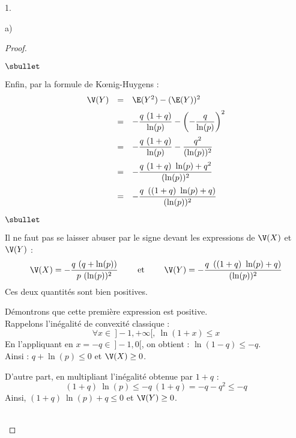 \begin{noliste}{1.}
\begin{noliste}{a)}
\begin{proof}
\begin{noliste}{$\sbullet$}
      \item Enfin, par la formule de K\oe{}nig-Huygens :
        \[
        \begin{array}{rcl}
          \V(Y) & = & \E(Y^2) - (\E(Y))^2 
          \\[.2cm]
          & = & - \dfrac{q \ (1+q)}{\ln(p)} - \left( -
            \dfrac{q}{\ln(p)} \right)^2
          \\[.4cm]
          & = & - \dfrac{q \ (1+q)}{\ln(p)} - \dfrac{q^2}{(\ln(p))^2}
          \\[.4cm]
          & = & - \dfrac{q \ (1+q) \ \ln(p) + q^2}{(\ln(p))^2}
          \\[.4cm]
          & = & - \dfrac{q \ \left( (1+q) \ \ln(p) + q \right)}{(\ln(p))^2}
        \end{array}
        \]
      \end{noliste}
      \begin{remark}%
        \begin{noliste}{$\sbullet$}
        \item Il ne faut pas se laisser abuser par le signe devant les
          expressions de $\V(X)$ et $\V(Y)$ :
          \[
          \V(X) = - \dfrac{q \ (q + \ln(p))}{p \ (\ln(p))^2} \qquad
          \text{ et } \qquad \V(Y) = - \dfrac{q \ \left( (1+q) \
              \ln(p) + q \right)}{(\ln(p))^2}
          \]
          Ces deux quantités sont bien positives.
        \item Démontrons que cette première expression est positive.\\
          Rappelons l'inégalité de convexité classique :
          \[
          \forall x \in \ ]-1, +\infty[, \ \ln(1+x) \leq x
          \]
          En l'appliquant en $x = -q \in \ ]-1, 0[$, on obtient :
          $\ln(1-q) \leq -q$.\\
          Ainsi : $q + \ln(p) \leq 0$ et $\V(X) \geq 0$.

        \item D'autre part, en multipliant l'inégalité obtenue par
          $1+q$ :
          \[
          (1+q) \ \ln(p) \leq -q \ (1+q) = -q - q^2 \leq -q
          \]
          Ainsi, $(1+q) \ \ln(p) + q \leq 0$ et $\V(Y) \geq 0$.
        \end{noliste}
      \end{remark}~\\[-1.2cm]
    \end{proof}
  \end{noliste}
\end{noliste}


